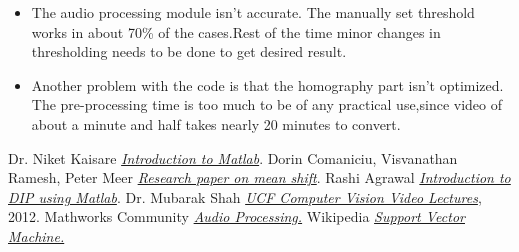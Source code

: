 \documentclass[a4paper,12pt,oneside]{book}
\begin{document}
\begin{itemize}
\begin{figure}[h!]
\begin{subfigure}{0.4\textwidth}
			\caption{Thresholding later with same threshold values}
		\end{subfigure}
	\end{figure}
\item The audio processing module isn't accurate. The manually set threshold works in about 70\% of the cases.Rest of the time minor changes in thresholding needs to be done to get desired result.
\item Another problem with the code is that the homography part isn't optimized. The pre-processing time is too much to be of any practical use,since video of about a minute and half takes nearly 20 minutes to convert. 
\end{itemize}




\begin{thebibliography}{li}
Dr. Niket Kaisare
{\em \href{https://www.youtube.com/watch?v=pj4KKLUMIAg&list=PLa8a_8vztYc7aK6H4bpQTbOqelVIND9Aw}{Introduction to Matlab}}.
Dorin Comaniciu, Visvanathan Ramesh, Peter Meer
{\em \href{http://comaniciu.net/Papers/MsTracking.pdf}{Research paper on mean shift}}.
 Rashi Agrawal
{\em \href{https://www.youtube.com/watch?v=-cSVGwAwZZ4&list=PLEo-jHOqGNyUWoCSD3l3V-FjX9PnHvx5n}{Introduction to DIP using Matlab}}.
 Dr. Mubarak Shah
{\em \href{https://www.youtube.com/watch?v=M8B3RZVqgOo}{UCF Computer Vision Video Lectures}},
2012.
Mathworks Community
{\em \href{http://in.mathworks.com/help/signal/examples/practical-introduction-to-frequency-domain-analysis.html}{Audio Processing.}}
Wikipedia
{\em \href{https://en.wikipedia.org/wiki/Support_vector_machine}{Support Vector Machine.}}

\end{thebibliography}
\end{document}

